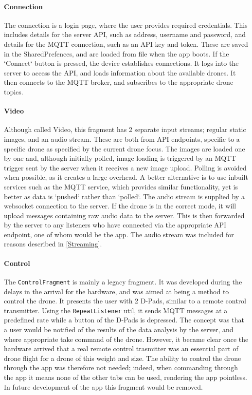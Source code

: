 \documentclass{article}
\begin{document}
\paragraph{Connection}
The connection is a login page, where the user provides required credentials. This includes details for the server API, such as address, username and password, and details for the MQTT connection, such as an API key and token. These are saved in the SharedPrefences, and are loaded from file when the app boots. If the `Connect` button is pressed, the device establishes connections. It logs into the server to access the API, and loads information about the available drones. It then connects to the MQTT broker, and subscribes to the appropriate drone topics.

\paragraph{Video}
Although called Video, this fragment has 2 separate input streams; regular static images, and an audio stream. These are both from API endpoints, specific to a specific drone as specified by the current drone focus. The images are loaded one by one and, although initially polled, image loading is triggered by an MQTT trigger sent by the server when it receives a new image upload. Polling is avoided when possible, as it creates a large overhead. A better alternative is to use inbuilt services such as the MQTT service, which provides similar functionality, yet is better as data is `pushed` rather than `polled`. The audio stream is supplied by a websocket connection to the server. If the drone is in the correct mode, it will upload messages containing raw audio data to the server. This is then forwarded by the server to any listeners who have connected via the appropriate API endpoint, one of whom would be the app. The audio stream was included for reasons described in \ref{Streaming}.

\paragraph{Control}
The \texttt{ControlFragment} is mainly a legacy fragment. It was developed during the delays in the arrival for the hardware, and was aimed at being a method to control the drone. It presents the user with 2 D-Pads, similar to a remote control transmitter. Using the \texttt{RepeatListener} util, it sends MQTT messages at a predefined rate while a button of the D-Pads is depressed. The concept was that a user would be notified of the results of the data analysis by the server, and where appropriate take command of the drone. However, it became clear once the hardware arrived that a real remote control trasmitter was an essential part of drone flight for a drone of this weight and size. The ability to control the drone through the app was therefore not needed; indeed, when commanding through the app it means none of the other tabs can be used, rendering the app pointless. In future development of the app this fragment would be removed.
\end{document}
